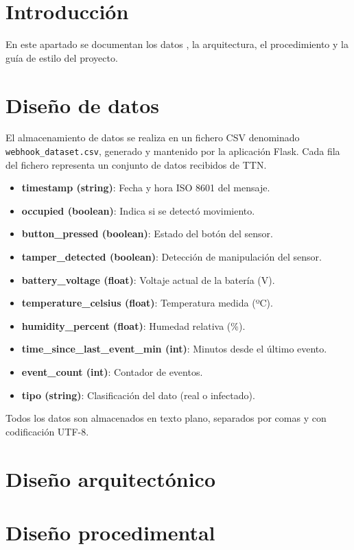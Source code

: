 
\section{Introducción}
En este apartado se documentan los datos , la arquitectura, el procedimiento y la guía de estilo del proyecto.
\section{Diseño de datos}

El almacenamiento de datos se realiza en un fichero CSV denominado \texttt{webhook\_dataset.csv}, generado y mantenido por la aplicación Flask. Cada fila del fichero representa un conjunto de datos recibidos de TTN.

\begin{itemize}
    \item \textbf{timestamp (string)}: Fecha y hora ISO 8601 del mensaje.
    \item \textbf{occupied (boolean)}: Indica si se detectó movimiento.
    \item \textbf{button\_pressed (boolean)}: Estado del botón del sensor.
    \item \textbf{tamper\_detected (boolean)}: Detección de manipulación del sensor.
    \item \textbf{battery\_voltage (float)}: Voltaje actual de la batería (V).
    \item \textbf{temperature\_celsius (float)}: Temperatura medida (ºC).
    \item \textbf{humidity\_percent (float)}: Humedad relativa (\%).
    \item \textbf{time\_since\_last\_event\_min (int)}: Minutos desde el último evento.
    \item \textbf{event\_count (int)}: Contador de eventos.
    \item \textbf{tipo (string)}: Clasificación del dato (real o infectado).
\end{itemize}

Todos los datos son almacenados en texto plano, separados por comas y con codificación UTF-8.

\section{Diseño arquitectónico}


\section{Diseño procedimental}

